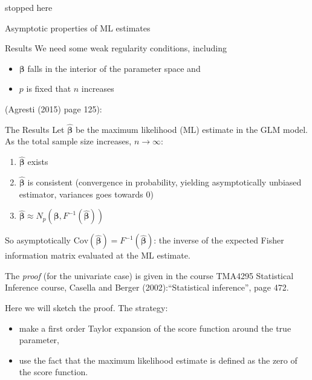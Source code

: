 \documentclass[
  ignorenonframetext,
]{beamer}
\providecommand{\tightlist}{%
  \setlength{\itemsep}{0pt}\setlength{\parskip}{0pt}}
\begin{document}
\begin{frame}
stopped here
\end{frame}

\begin{frame}{Asymptotic properties of ML estimates}
\protect\hypertarget{asymptotic-properties-of-ml-estimates}{}
\begin{block}{Results}
\protect\hypertarget{results}{}
We need some weak regularity conditions, including

\begin{itemize}
\tightlist
\item
  \(\boldsymbol{\beta}\) falls in the interior of the parameter space
  and
\item
  \(p\) is fixed that \(n\) increases
\end{itemize}

(Agresti (2015) page 125):
\end{block}
\end{frame}

\begin{frame}
\begin{block}{The Results}
\protect\hypertarget{the-results}{}
Let \(\hat{\boldsymbol{\beta}}\) be the maximum likelihood (ML) estimate
in the GLM model. As the total sample size increases,
\(n\rightarrow \infty\):

\begin{enumerate}
\tightlist
\item
  \(\hat{\boldsymbol{\beta}}\) exists
\item
  \(\hat{\boldsymbol{\beta}}\) is consistent (convergence in
  probability, yielding asymptotically unbiased estimator, variances
  goes towards 0)
\item
  \(\hat{\boldsymbol{\beta}} \approx N_p(\boldsymbol{\beta},F^{-1}(\hat{\boldsymbol{\beta}}))\)
\end{enumerate}

So asymptotically
\(\text{Cov}(\hat{\boldsymbol{\beta}})=F^{-1}(\hat{\boldsymbol{\beta}})\):
the inverse of the expected Fisher information matrix evaluated at the
ML estimate.
\end{block}
\end{frame}

\begin{frame}
The \emph{proof} (for the univariate case) is given in the course
TMA4295 Statistical Inference course, Casella and Berger
(2002):``Statistical inference'', page 472.

Here we will sketch the proof. The strategy:

\begin{itemize}
\tightlist
\item
  make a first order Taylor expansion of the score function around the
  true parameter,
\item
  use the fact that the maximum likelihood estimate is defined as the
  zero of the score function.
\end{itemize}
\end{frame}
\end{document}
